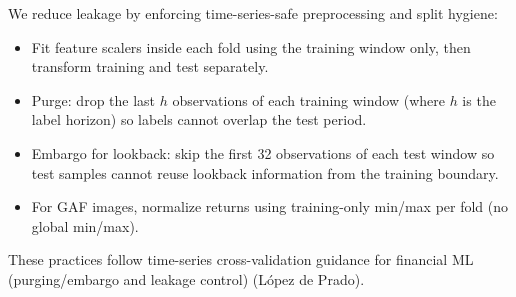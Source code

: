 We reduce leakage by enforcing time-series-safe preprocessing and split hygiene:
\begin{itemize}
\item Fit feature scalers inside each fold using the training window only, then transform training and test separately.
\item Purge: drop the last \(h\) observations of each training window (where \(h\) is the label horizon) so labels cannot overlap the test period.
\item Embargo for lookback: skip the first 32 observations of each test window so test samples cannot reuse lookback information from the training boundary.
\item For GAF images, normalize returns using training-only min/max per fold (no global min/max).
\end{itemize}
These practices follow time-series cross-validation guidance for financial ML (purging/embargo and leakage control) (L\'opez de Prado).

